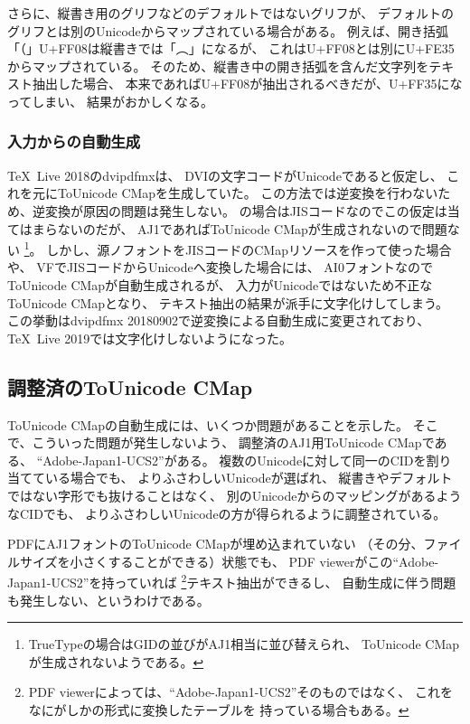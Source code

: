 さらに、縦書き用のグリフなどのデフォルトではないグリフが、
デフォルトのグリフとは別のUnicodeからマップされている場合がある。
例えば、開き括弧「（」U+FF08は縦書きでは「︵」になるが、
これはU+FF08とは別にU+FE35からマップされている。
そのため、縦書き中の開き括弧を含んだ文字列をテキスト抽出した場合、
本来であればU+FF08が抽出されるべきだが、U+FF35になってしまい、
結果がおかしくなる。

\subsubsection{入力からの自動生成}

\TeX \ Live 2018のdvipdfmxは、
DVIの文字コードがUnicodeであると仮定し、
これを元にToUnicode CMapを生成していた。
この方法では逆変換を行わないため、逆変換が原因の問題は発生しない。
\pTeX の場合はJISコードなのでこの仮定は当てはまらないのだが、
AJ1であればToUnicode CMapが生成されないので問題ない
\footnote{TrueTypeの場合はGIDの並びがAJ1相当に並び替えられ、
  ToUnicode CMapが生成されないようである。}。
しかし、源ノフォントをJISコードのCMapリソースを作って使った場合や、
VFでJISコードからUnicodeへ変換した場合には、
AI0フォントなのでToUnicode CMapが自動生成されるが、
入力がUnicodeではないため不正なToUnicode CMapとなり、
テキスト抽出の結果が派手に文字化けしてしまう。
この挙動はdvipdfmx 20180902で逆変換による自動生成に変更されており、
\TeX \ Live 2019では文字化けしないようになった。

\subsection{調整済のToUnicode CMap}

ToUnicode CMapの自動生成には、いくつか問題があることを示した。
そこで、こういった問題が発生しないよう、
調整済のAJ1用ToUnicode CMapである、
``Adobe-Japan1-UCS2''がある\cite{mapping-resources}。
複数のUnicodeに対して同一のCIDを割り当てている場合でも、
よりふさわしいUnicodeが選ばれ、
縦書きやデフォルトではない字形でも抜けることはなく、
別のUnicodeからのマッピングがあるようなCIDでも、
よりふさわしいUnicodeの方が得られるように調整されている。

PDFにAJ1フォントのToUnicode CMapが埋め込まれていない
（その分、ファイルサイズを小さくすることができる）状態でも、
PDF viewerがこの``Adobe-Japan1-UCS2''を持っていれば
\footnote{PDF viewerによっては、``Adobe-Japan1-UCS2''そのものではなく、
  これをなにがしかの形式に変換したテーブルを
  持っている場合もある。}テキスト抽出ができるし、
自動生成に伴う問題も発生しない、というわけである。

